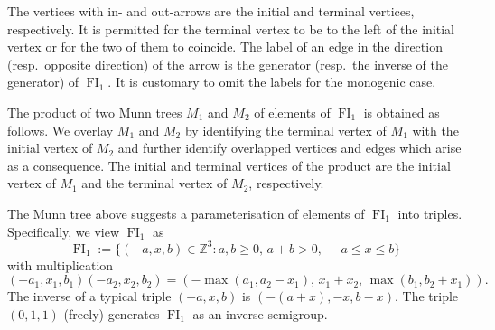 \documentclass[reqno]{amsart}
\theoremstyle{plain}
\theoremstyle{definition}
\DeclareMathOperator{\FI}{FI}
\numberwithin{equation}{section}
\begin{document}
\begin{center}
\end{center}
The vertices with in- and out-arrows are the initial and terminal vertices, respectively. It is permitted for the terminal vertex to be to the left of the initial vertex or for the two of them to coincide. The label of an edge in the direction (resp.\ opposite direction) of the arrow is the generator (resp.\ the inverse of the generator) of $\FI_1$. It is customary to omit the labels for the monogenic case.

The product of two Munn trees $M_1$ and $M_2$ of elements of $\FI_1$ is obtained as follows. We overlay $M_1$ and $M_2$ by identifying the terminal vertex of $M_1$ with the initial vertex of $M_2$ and further identify overlapped vertices and edges which arise as a consequence. The initial and terminal vertices of the product are the initial vertex of $M_1$ and the terminal vertex of $M_2$, respectively.

The Munn tree above suggests a parameterisation of elements of $\FI_1$ into triples. Specifically, we view $\FI_1$ as 
\[
\FI_1 := \{(-a, x, b)\in \mathbb{Z}^3 : a,b\geq 0, \,
a+b>0,\, -a\leq x\leq b\}
\]
with multiplication
\[
(-a_1, x_1, b_1)(-a_2, x_2, b_2) = (-\max(a_1, a_2-x_1), \, x_1+x_2,\, \max(b_1, b_2+x_1)).
\]
The inverse of a typical triple $(-a, x, b)$ is $(-(a+x), -x, b-x)$. The triple $(0, 1, 1)$ 
(freely) generates $\FI_1$ as an inverse semigroup.
\end{document}

